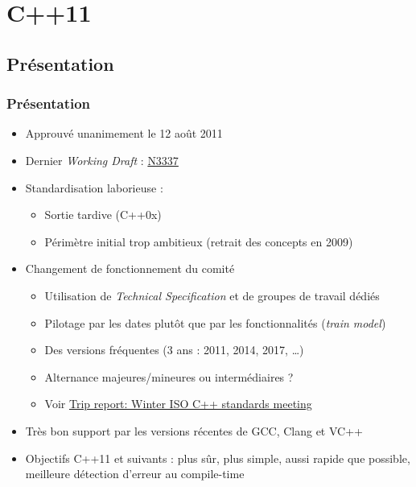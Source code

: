 \documentclass[C++.tex]{subfiles}
\begin{document}
\section{C++11}
\subsection*{Présentation}
\begin{frame}
	\frametitle{Présentation}
	\begin{itemize}
		\item Approuvé unanimement le 12 août 2011
	
	
		\item Dernier \textit{Working Draft} : \href{http://www.open-std.org/jtc1/sc22/wg21/docs/papers/2012/n3337.pdf}{N3337}
	
	
		\item Standardisation laborieuse :
		\begin{itemize}
			\item Sortie tardive (C++0x)
			\item Périmètre initial trop ambitieux (retrait des concepts en 2009)
		\end{itemize}
		\item Changement de fonctionnement du comité
		\begin{itemize}
			\item Utilisation de \textit{Technical Specification} et de groupes de travail dédiés
			\item Pilotage par les dates plutôt que par les fonctionnalités (\textit{train model})
			\item Des versions fréquentes (3 ans : 2011, 2014, 2017, \ldots)
			\item Alternance majeures/mineures ou intermédiaires ?
			\item Voir \href{https://herbsutter.com/2016/03/11/trip-report-winter-iso-c-standards-meeting/}{Trip report: Winter ISO C++ standards meeting}
		\end{itemize}
		\item Très bon support par les versions récentes de GCC, Clang et VC++
	
	
		\item Objectifs C++11 et suivants : plus sûr, plus simple, aussi rapide que possible, meilleure détection d'erreur au compile-time
	

\end{itemize}
\end{frame}
\end{document}

